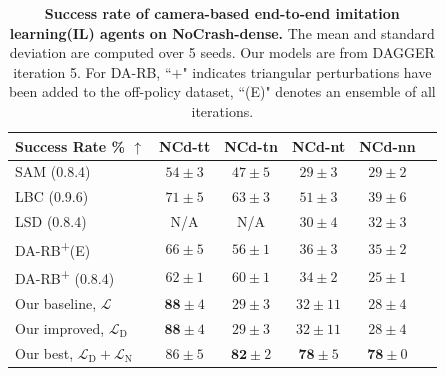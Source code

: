 \begin{table}
	\caption{\textbf{Success rate of camera-based end-to-end imitation learning(IL) agents on NoCrash-dense.}
		The mean and standard deviation are computed over 5 seeds. 
		Our models are from DAGGER iteration 5. 
		For DA-RB, ``+" indicates triangular perturbations have been added to the off-policy dataset, ``(E)" denotes an ensemble of all iterations.}
	\setlength{\tabcolsep}{6.67pt}
	\centering
	\begin{tabular}{lccccc}
		\hline
		Success Rate \% $\uparrow$
		&  NCd-tt & NCd-tn  & NCd-nt & NCd-nn  \\ 
		\hline
		SAM \cite{zhao2021sam} (0.8.4) & 
		$54 \pm 3$ & $47 \pm 5$ & $29 \pm 3$ & $29 \pm 2$ \\
		LBC \cite{chen2020learning} (0.9.6) & 
		$71 \pm 5$ & $63 \pm 3$ & $51 \pm 3$ & $39 \pm 6$ \\
		LSD \cite{ohn2020learning} (0.8.4) & 
		N/A & N/A & $30 \pm 4$ & $32 \pm 3$ \\
		DA-RB\textsuperscript{+}(E) \cite{prakash2020exploring} & 
		$66 \pm 5$ & $56 \pm 1$ & $36 \pm 3$ & $35 \pm 2$ \\
		DA-RB\textsuperscript{+} \cite{prakash2020exploring} (0.8.4)  & 
		$62 \pm 1$ & $60 \pm 1$ & $34 \pm 2$ & $25 \pm 1$ \\
		Our baseline, $\mathcal{L}$ & 
		$\mathbf{88} \pm 4$ & $29 \pm 3$ & $32 \pm 11$ & $28 \pm 4$ \\
		Our improved, $\mathcal{L}_\text{D} $ & 
		$\mathbf{88} \pm 4$ & $29 \pm 3$ & $32 \pm 11$ & $28 \pm 4$ \\
		Our best, $\mathcal{L}_\text{D}+\mathcal{L}_\text{N}$ & 
		$86 \pm 5$ & $\mathbf{82} \pm 2$ & $\mathbf{78} \pm 5$ & $\mathbf{78} \pm 0$ \\
		\hline
	\end{tabular}
	\vspace{-1ex}
	\label{table:sucess_rate_nc_dense}
	\vspace{-2ex}
\end{table}

